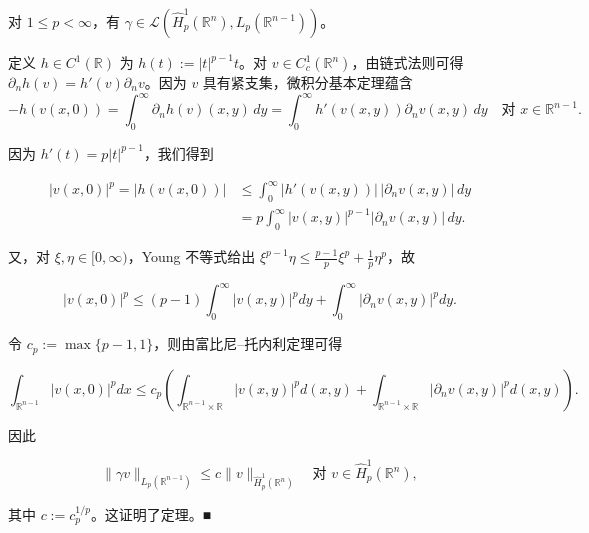 \begin{proposition}

对 $ 1 \le p < \infty $，有 $ \gamma \in \mathcal{L}\left(\widehat{H}^{1}_{p}(\mathbb{R}^{n}),L_{p}(\mathbb{R}^{n-1})\right) $。

\proofhead
定义 $ h \in C^{1}(\mathbb{R}) $ 为 $ h(t) := |t|^{p-1}t $。对 $ v \in C_{c}^{1}(\mathbb{R}^{n}) $，由链式法则可得 $ \partial_{n}h(v) = h'(v)\partial_{n}v $。因为 $ v $ 具有紧支集，微积分基本定理蕴含
\[
-h(v(x,0)) = \int_{0}^{\infty}\partial_{n}h(v)(x,y)\,dy = \int_{0}^{\infty}h'(v(x,y))\partial_{n}v(x,y)\,dy \quad \text{对 } x \in \mathbb{R}^{n-1} .
\]

因为 $ h'(t) = p|t|^{p-1} $，我们得到

\begin{equation*}
\begin{aligned}
|v(x,0)|^{p} = |h(v(x,0))| &\le \int_{0}^{\infty}|h'(v(x,y))|\,|\partial_{n}v(x,y)|\,dy \\ &= p\int_{0}^{\infty}|v(x,y)|^{p-1}|\partial_{n}v(x,y)|\,dy .
\end{aligned}
\end{equation*}

又，对 $ \xi,\eta \in [0,\infty) $，Young 不等式给出 $ \xi^{p-1}\eta \le \frac{p-1}{p}\xi^p + \frac{1}{p}\eta^p $，故

\[
|v(x,0)|^p \le (p-1)\int_0^\infty |v(x,y)|^p dy + \int_0^\infty |\partial_n v(x,y)|^p dy .
\]

令 $ c_p := \max\{p-1,1\} $，则由富比尼–托内利定理可得

\begin{equation}
\int_{\mathbb{R}^{n-1}} |v(x,0)|^p dx \le c_p \left( \int_{\mathbb{R}^{n-1}\times\mathbb{R}} |v(x,y)|^p d(x,y) + \int_{\mathbb{R}^{n-1}\times\mathbb{R}} |\partial_n v(x,y)|^p d(x,y) \right) .\tag{6.25}
\end{equation}

因此

\[
\|\gamma v\|_{L_p(\mathbb{R}^{n-1})} \le c \|v\|_{\widehat{H}_p^1(\mathbb{R}^n)} \quad \text{对 } v \in \widehat{H}_p^1(\mathbb{R}^n) ,
\]

其中 $ c := c_p^{1/p} $。这证明了定理。\nobreak\hspace{0.35em}■

\end{proposition}

